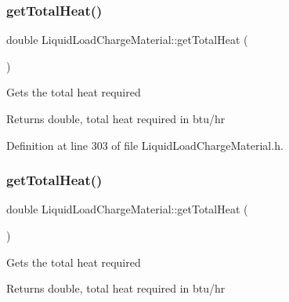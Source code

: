 \mbox{\label{class_liquid_load_charge_material_a51a9826325e2c34cd073b8766331d476}} 
\subsubsection{\texorpdfstring{get\+Total\+Heat()}{getTotalHeat()}\hspace{0.1cm}{\footnotesize\ttfamily [2/3]}}
{\footnotesize\ttfamily double Liquid\+Load\+Charge\+Material\+::get\+Total\+Heat (\begin{DoxyParamCaption}{ }\end{DoxyParamCaption})\hspace{0.3cm}{\ttfamily [inline]}}

Gets the total heat required

\begin{DoxyReturn}{Returns}
double, total heat required in btu/hr 
\end{DoxyReturn}


Definition at line 303 of file Liquid\+Load\+Charge\+Material.\+h.

\mbox{\label{class_liquid_load_charge_material_a51a9826325e2c34cd073b8766331d476}} 
\subsubsection{\texorpdfstring{get\+Total\+Heat()}{getTotalHeat()}\hspace{0.1cm}{\footnotesize\ttfamily [3/3]}}
{\footnotesize\ttfamily double Liquid\+Load\+Charge\+Material\+::get\+Total\+Heat (\begin{DoxyParamCaption}{ }\end{DoxyParamCaption})\hspace{0.3cm}{\ttfamily [inline]}}

Gets the total heat required

\begin{DoxyReturn}{Returns}
double, total heat required in btu/hr 
\end{DoxyReturn}


